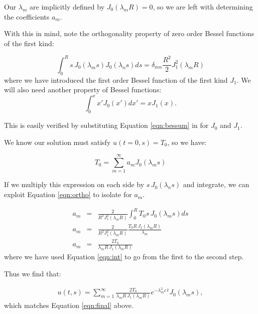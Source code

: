 \documentclass[a4paper,12pt]{article}
\begin{document}
Our $\lambda_m$ are implicitly defined by $J_0(\lambda_m R) = 0$, so we are left with determining the coefficients $a_m$.

With this in mind, note the orthogonality property of zero order Bessel functions of the first kind: 

\begin{equation}
\int_{0}^{R}s\,J_0(\lambda_m s)J_0(\lambda_n s)ds = \delta_{mn}\frac{R^2}{2}J_1^2(\lambda_m R)
\label{eqn:ortho}
\end{equation}
%
where we have introduced the first order Bessel function of the first kind $J_1$. We will also need another property of Bessel functions:
\begin{equation}
\int_{0}^{x} x'J_0(x')dx' = xJ_1(x).
\label{eqn:int}
\end{equation} 

This is easily verified by substituting Equation \ref{eqn:bessum} in for $J_0$ and $J_1$.

We know our solution must satisfy $u(t=0,s) = T_0$, so we have:

\begin{equation}
T_0 = \sum_{m=1}^{\infty}a_m J_0(\lambda_m s)\nonumber
\end{equation}

If we multiply this expression on each side by $s\,J_0(\lambda_n s)$ and integrate, we can exploit Equation \ref{eqn:ortho} to isolate for $a_m$.

\begin{eqnarray}
a_m &=& \frac{2}{R^2 J_1^2(\lambda_m R)}\int_{0}^{R}T_0 s\,J_0(\lambda_m s)ds\nonumber\\
a_m &=& \frac{2}{R^2 J_1^2(\lambda_m R)} \frac{T_0 R\, J_1(\lambda_m R)}{\lambda_m}\nonumber\\
a_m &=& \frac{2 T_0}{\lambda_m R\, J_1(\lambda_m R)}\nonumber
\end{eqnarray}
%
where we have used Equation \ref{eqn:int} to go from the first to the second step.

Thus we find that:

\begin{eqnarray}
u(t,s) = \sum_{m=1}^{\infty}\frac{2 T_0}{\lambda_m R\, J_1(\lambda_m R)} e^{-\lambda_m^2 c\,t} J_0(\lambda_m s),\nonumber
\end{eqnarray}
%
which matches Equation \ref{eqn:final} above.
\end{document}
